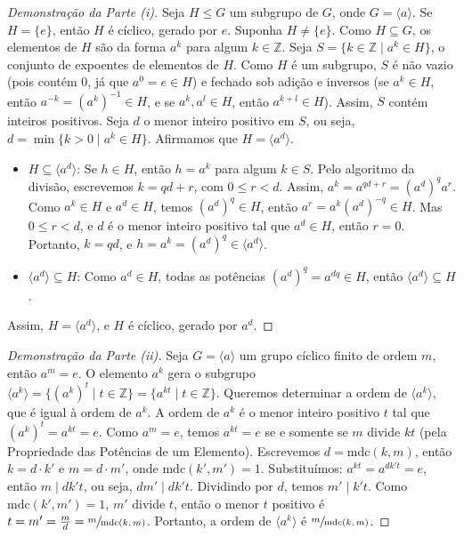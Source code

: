 \begin{proof}[Demonstração da Parte (i)]
  Seja $H \leq G$ um subgrupo de $G$, onde $G = \langle a \rangle$. Se
  $H = \{e\}$, então $H$ é cíclico, gerado por $e$. Suponha $H \neq \{e\}$.
  Como $H \subseteq G$, os elementos de $H$ são da forma $a^k$ para algum
  $k \in \mathbb{Z}$. Seja $S = \{ k \in \mathbb{Z} \mid a^k \in H \}$, o conjunto de
  expoentes de elementos de $H$. Como $H$ é um subgrupo, $S$ é não vazio (pois
  contém 0, já que $a^0 = e \in H$) e fechado sob adição e inversos (se
  $a^k \in H$, então $a^{-k} = (a^k)^{-1} \in H$, e se $a^k, a^l \in H$, então
  $a^{k+l} \in H$). Assim, $S$ contém inteiros positivos. Seja $d$ o menor
  inteiro positivo em $S$, ou seja, $d = \min \{ k > 0 \mid a^k \in H \}$.
  Afirmamos que $H = \langle a^d \rangle$.
\begin{itemize}
    \item \emph{$H \subseteq \langle a^d \rangle$}: Se $h \in H$, então $h = a^k$
      para algum $k \in S$. Pelo algoritmo da divisão, escrevemos $k = qd + r$,
      com $0 \leq r < d$. Assim, $a^k = a^{qd + r} = (a^d)^q a^r$. Como
      $a^k \in H$ e $a^d \in H$, temos $(a^d)^q \in H$, então $a^r = a^k (a^d)^{-q} \in H$.
      Mas $0 \leq r < d$, e $d$ é o menor inteiro positivo
      tal que $a^d \in H$, então $r = 0$. Portanto, $k = qd$, e
      $h = a^k = (a^d)^q \in \langle a^d \rangle$.
    \item \emph{$\langle a^d \rangle \subseteq H$}: Como $a^d \in H$, todas as
      potências $(a^d)^q = a^{dq} \in H$, então $\langle a^d \rangle \subseteq H$.
\end{itemize}
  Assim, $H = \langle a^d \rangle$, e $H$ é cíclico, gerado por $a^d$.
\end{proof}

\begin{proof}[Demonstração da Parte (ii)]
  Seja $G = \langle a \rangle$ um grupo cíclico finito de ordem $m$, então $a^m = e$.
  O elemento $a^k$ gera o subgrupo $\langle a^k \rangle = \{ (a^k)^t \mid t
  \in \mathbb{Z} \} = \{ a^{kt} \mid t \in \mathbb{Z} \}$. Queremos determinar
  a ordem de $\langle a^k \rangle$, que é igual à ordem de $a^k$. A ordem de
  $a^k$ é o menor inteiro positivo $t$ tal que $(a^k)^t = a^{kt} = e$. Como
  $a^m = e$, temos $a^{kt} = e$ se e somente se $m$ divide $kt$ (pela
  Propriedade das Potências de um Elemento). Escrevemos $d = \text{mdc}(k, m)$,
  então $k = d \cdot k'$ e $m = d \cdot m'$, onde $\text{mdc}(k', m') = 1$.
  Substituímos: $a^{kt} = a^{d k' t} = e$, então $m \mid d k' t$, ou seja, $d
  m' \mid d k' t$. Dividindo por $d$, temos $m' \mid k' t$. Como
  $\text{mdc}(k', m') = 1$, $m'$ divide $t$, então o menor $t$ positivo é $t =
  m' = \frac{m}{d} = \sfrac{m}{\text{mdc}(k, m)}$. Portanto, a ordem de $\langle
  a^k \rangle$ é $\sfrac{m}{\text{mdc}(k, m)}$.
\end{proof}

